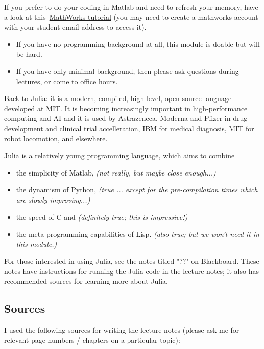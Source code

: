 \documentclass[12pt,a4paper]{article}
\begin{document}
If you prefer to do your coding in Matlab and need to refresh your memory, have a look at this \href{https://matlabacademy.mathworks.com/details/matlab-onramp/gettingstarted}{MathWorks tutorial} (you may need to create a mathworks account with your student email address to access it).

\begin{itemize}
\item If you have no programming background at all, this module is doable but will be hard. 


\item If you have only minimal background, then please ask questions during lectures, or come to office hours.

\end{itemize}
Back to Julia: it is a modern, compiled, high-level, open-source language developed at MIT. It is becoming increasingly important in high-performance computing and AI and it is used by Astrazeneca, Moderna and Pfizer in drug development and clinical trial accelleration, IBM for medical diagnosis, MIT for robot locomotion, and elsewhere.

Julia is a relatively young programming language, which aims to combine 

\begin{itemize}
\item the simplicity of Matlab,   \emph{(not really, but maybe close enough...)}


\item the dynamism of Python,    \emph{(true ... except for the pre-compilation times which are slowly improving...)}


\item the speed of C and          \emph{(definitely true; this is impressive!)}


\item the meta-programming capabilities of Lisp.     \emph{(also true; but we won't need it in this module.)}

\end{itemize}
For those interested in using Julia, see the notes titled "??" on Blackboard.  These notes have instructions for running the Julia code in the lecture notes;  it also has recommended sources for learning more about Julia. 

\subsection{Sources}
I used the following sources for writing the lecture notes (please ask me for relevant page numbers / chapters on a particular topic):
\end{document}
